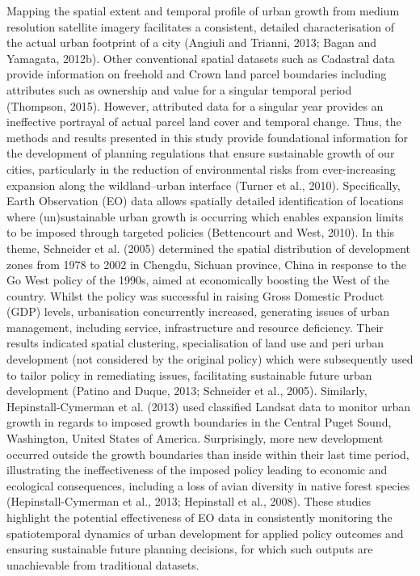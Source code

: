 \documentclass[]{book}
\begin{document}
Mapping the spatial extent and temporal profile of urban growth from
medium resolution satellite imagery facilitates a consistent, detailed
characterisation of the actual urban footprint of a city (Angiuli and
Trianni, 2013; Bagan and Yamagata, 2012b). Other conventional spatial
datasets such as Cadastral data provide information on freehold and
Crown land parcel boundaries including attributes such as ownership and
value for a singular temporal period (Thompson, 2015). However,
attributed data for a singular year provides an ineffective portrayal of
actual parcel land cover and temporal change. Thus, the methods and
results presented in this study provide foundational information for the
development of planning regulations that ensure sustainable growth of
our cities, particularly in the reduction of environmental risks from
ever-increasing expansion along the wildland--urban interface (Turner et
al., 2010). Specifically, Earth Observation (EO) data allows spatially
detailed identification of locations where (un)sustainable urban growth
is occurring which enables expansion limits to be imposed through
targeted policies (Bettencourt and West, 2010). In this theme, Schneider
et al. (2005) determined the spatial distribution of development zones
from 1978 to 2002 in Chengdu, Sichuan province, China in response to the
Go West policy of the 1990s, aimed at economically boosting the West of
the country. Whilst the policy was successful in raising Gross Domestic
Product (GDP) levels, urbanisation concurrently increased, generating
issues of urban management, including service, infrastructure and
resource deficiency. Their results indicated spatial clustering,
specialisation of land use and peri urban development (not considered by
the original policy) which were subsequently used to tailor policy in
remediating issues, facilitating sustainable future urban development
(Patino and Duque, 2013; Schneider et al., 2005). Similarly,
Hepinstall-Cymerman et al. (2013) used classified Landsat data to
monitor urban growth in regards to imposed growth boundaries in the
Central Puget Sound, Washington, United States of America. Surprisingly,
more new development occurred outside the growth boundaries than inside
within their last time period, illustrating the ineffectiveness of the
imposed policy leading to economic and ecological consequences,
including a loss of avian diversity in native forest species
(Hepinstall-Cymerman et al., 2013; Hepinstall et al., 2008). These
studies highlight the potential effectiveness of EO data in consistently
monitoring the spatiotemporal dynamics of urban development for applied
policy outcomes and ensuring sustainable future planning decisions, for
which such outputs are unachievable from traditional datasets.
\end{document}
